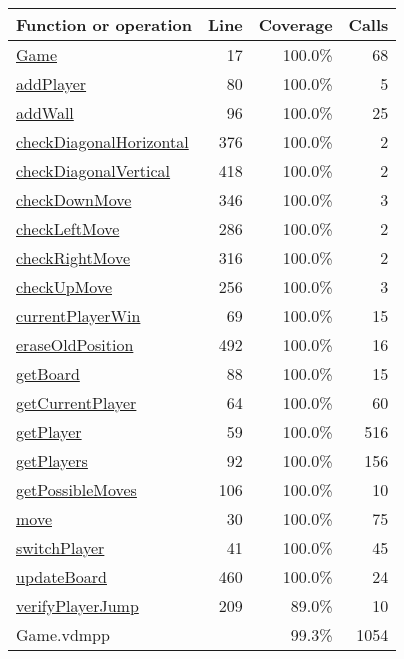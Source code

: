 \begin{longtable}{|l|r|r|r|}
\hline
Function or operation & Line & Coverage & Calls \\
\hline
\hline
\hyperref[Game:17]{Game} & 17&100.0\% & 68 \\
\hline
\hyperref[addPlayer:80]{addPlayer} & 80&100.0\% & 5 \\
\hline
\hyperref[addWall:96]{addWall} & 96&100.0\% & 25 \\
\hline
\hyperref[checkDiagonalHorizontal:376]{checkDiagonalHorizontal} & 376&100.0\% & 2 \\
\hline
\hyperref[checkDiagonalVertical:418]{checkDiagonalVertical} & 418&100.0\% & 2 \\
\hline
\hyperref[checkDownMove:346]{checkDownMove} & 346&100.0\% & 3 \\
\hline
\hyperref[checkLeftMove:286]{checkLeftMove} & 286&100.0\% & 2 \\
\hline
\hyperref[checkRightMove:316]{checkRightMove} & 316&100.0\% & 2 \\
\hline
\hyperref[checkUpMove:256]{checkUpMove} & 256&100.0\% & 3 \\
\hline
\hyperref[currentPlayerWin:69]{currentPlayerWin} & 69&100.0\% & 15 \\
\hline
\hyperref[eraseOldPosition:492]{eraseOldPosition} & 492&100.0\% & 16 \\
\hline
\hyperref[getBoard:88]{getBoard} & 88&100.0\% & 15 \\
\hline
\hyperref[getCurrentPlayer:64]{getCurrentPlayer} & 64&100.0\% & 60 \\
\hline
\hyperref[getPlayer:59]{getPlayer} & 59&100.0\% & 516 \\
\hline
\hyperref[getPlayers:92]{getPlayers} & 92&100.0\% & 156 \\
\hline
\hyperref[getPossibleMoves:106]{getPossibleMoves} & 106&100.0\% & 10 \\
\hline
\hyperref[move:30]{move} & 30&100.0\% & 75 \\
\hline
\hyperref[switchPlayer:41]{switchPlayer} & 41&100.0\% & 45 \\
\hline
\hyperref[updateBoard:460]{updateBoard} & 460&100.0\% & 24 \\
\hline
\hyperref[verifyPlayerJump:209]{verifyPlayerJump} & 209&89.0\% & 10 \\
\hline
\hline
Game.vdmpp & & 99.3\% & 1054 \\
\hline
\end{longtable}

